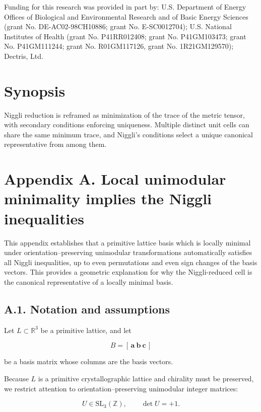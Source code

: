\documentclass[preprint]{iucr}              %
\numberwithin{equation}{section}
\begin{document}
	
	Funding for this research was provided in part by:
	U.S. Department of Energy Offices of Biological and
	Environmental Research and of Basic Energy Sciences
	(grant No. DE-AC02-98CH10886; grant No. E-SC0012704);
	U.S. National Institutes of Health (grant No. P41RR012408;
	grant No. P41GM103473; grant No. P41GM111244;
	grant No. R01GM117126,
	grant No. 1R21GM129570); Dectris, Ltd.
	
	
	\section{Synopsis}
	
	Niggli reduction is reframed as minimization of the trace of the metric
	tensor, with secondary conditions enforcing uniqueness. Multiple distinct
	unit cells can share the same minimum trace, and Niggli's conditions
	select a unique canonical representative from among them.
	
	
\appendix
\appendix

\section*{Appendix A. Local unimodular minimality implies the Niggli inequalities}

This appendix establishes that a primitive lattice basis which is locally
minimal under orientation–preserving unimodular transformations
automatically satisfies all Niggli inequalities, up to even permutations
and even sign changes of the basis vectors.  This provides a geometric
explanation for why the Niggli-reduced cell is the canonical
representative of a locally minimal basis.

\subsection*{A.1. Notation and assumptions}

Let $L \subset \mathbb{R}^3$ be a primitive lattice, and let


\[
B = [\,\mathbf{a}\ \mathbf{b}\ \mathbf{c}\,]
\]


be a basis matrix whose columns are the basis vectors.

Because $L$ is a primitive crystallographic lattice and chirality must be
preserved, we restrict attention to orientation–preserving unimodular
integer matrices:


\[
U \in \mathrm{SL}_3(\mathbb{Z}), \qquad \det U = +1.
\]
\end{document}
